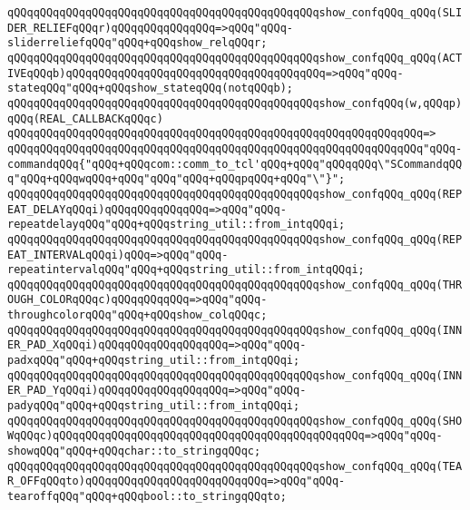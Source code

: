 \newline
\verb|qQQqqQQqqQQqqQQqqQQqqQQqqQQqqQQqqQQqqQQqqQQqqQQqshow_confqQQq_qQQq(SLIDER_RELIEFqQQqr)qQQqqQQqqQQqqQQq=>qQQq"qQQq-sliderreliefqQQq"qQQq+qQQqshow_relqQQqr;|\newline
\verb|qQQqqQQqqQQqqQQqqQQqqQQqqQQqqQQqqQQqqQQqqQQqqQQqshow_confqQQq_qQQq(ACTIVEqQQqb)qQQqqQQqqQQqqQQqqQQqqQQqqQQqqQQqqQQqqQQq=>qQQq"qQQq-stateqQQq"qQQq+qQQqshow_stateqQQq(notqQQqb);|\newline
\newline
\verb|qQQqqQQqqQQqqQQqqQQqqQQqqQQqqQQqqQQqqQQqqQQqqQQqshow_confqQQq(w,qQQqp)qQQq(REAL_CALLBACKqQQqc)|\newline
\verb|qQQqqQQqqQQqqQQqqQQqqQQqqQQqqQQqqQQqqQQqqQQqqQQqqQQqqQQqqQQqqQQq=>|\newline
\verb|qQQqqQQqqQQqqQQqqQQqqQQqqQQqqQQqqQQqqQQqqQQqqQQqqQQqqQQqqQQqqQQq"qQQq-commandqQQq{"qQQq+qQQqcom::comm_to_tcl'qQQq+qQQq"qQQqqQQq\"SCommandqQQq"qQQq+qQQqwqQQq+qQQq"qQQq"qQQq+qQQqpqQQq+qQQq"\"}";|\newline
\newline
\verb|qQQqqQQqqQQqqQQqqQQqqQQqqQQqqQQqqQQqqQQqqQQqqQQqshow_confqQQq_qQQq(REPEAT_DELAYqQQqi)qQQqqQQqqQQqqQQq=>qQQq"qQQq-repeatdelayqQQq"qQQq+qQQqstring_util::from_intqQQqi;|\newline
\verb|qQQqqQQqqQQqqQQqqQQqqQQqqQQqqQQqqQQqqQQqqQQqqQQqshow_confqQQq_qQQq(REPEAT_INTERVALqQQqi)qQQq=>qQQq"qQQq-repeatintervalqQQq"qQQq+qQQqstring_util::from_intqQQqi;|\newline
\verb|qQQqqQQqqQQqqQQqqQQqqQQqqQQqqQQqqQQqqQQqqQQqqQQqshow_confqQQq_qQQq(THROUGH_COLORqQQqc)qQQqqQQqqQQq=>qQQq"qQQq-throughcolorqQQq"qQQq+qQQqshow_colqQQqc;|\newline
\verb|qQQqqQQqqQQqqQQqqQQqqQQqqQQqqQQqqQQqqQQqqQQqqQQqshow_confqQQq_qQQq(INNER_PAD_XqQQqi)qQQqqQQqqQQqqQQqqQQq=>qQQq"qQQq-padxqQQq"qQQq+qQQqstring_util::from_intqQQqi;|\newline
\verb|qQQqqQQqqQQqqQQqqQQqqQQqqQQqqQQqqQQqqQQqqQQqqQQqshow_confqQQq_qQQq(INNER_PAD_YqQQqi)qQQqqQQqqQQqqQQqqQQq=>qQQq"qQQq-padyqQQq"qQQq+qQQqstring_util::from_intqQQqi;|\newline
\verb|qQQqqQQqqQQqqQQqqQQqqQQqqQQqqQQqqQQqqQQqqQQqqQQqshow_confqQQq_qQQq(SHOWqQQqc)qQQqqQQqqQQqqQQqqQQqqQQqqQQqqQQqqQQqqQQqqQQqqQQq=>qQQq"qQQq-showqQQq"qQQq+qQQqchar::to_stringqQQqc;|\newline
\verb|qQQqqQQqqQQqqQQqqQQqqQQqqQQqqQQqqQQqqQQqqQQqqQQqshow_confqQQq_qQQq(TEAR_OFFqQQqto)qQQqqQQqqQQqqQQqqQQqqQQqqQQq=>qQQq"qQQq-tearoffqQQq"qQQq+qQQqbool::to_stringqQQqto;|\newline
